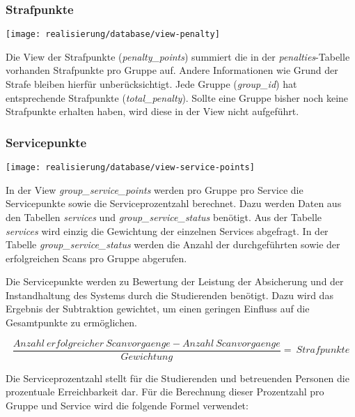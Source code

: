 \subsubsection{Strafpunkte}
\begin{center}
	\texttt{[image: realisierung/database/view-penalty]}
	\label{fig:realisierung-view-penalty}
\end{center}

Die View der Strafpunkte (\textit{penalty\_points}) summiert die in der \textit{penalties}-Tabelle vorhanden Strafpunkte pro Gruppe auf. Andere Informationen wie Grund der Strafe bleiben hierfür unberücksichtigt. Jede Gruppe (\textit{group\_id}) hat entsprechende Strafpunkte (\textit{total\_penalty}). Sollte eine Gruppe bisher noch keine Strafpunkte erhalten haben, wird diese in der View nicht aufgeführt.

\subsubsection{Servicepunkte}
\begin{center}
	\texttt{[image: realisierung/database/view-service-points]}
	\label{fig:realisierung-view-service-points}
\end{center}

In der View \textit{group\_service\_points} werden pro Gruppe pro Service die Servicepunkte sowie die Serviceprozentzahl  berechnet. Dazu werden Daten aus den Tabellen \textit{services} und \textit{group\_service\_status} benötigt. Aus der Tabelle \textit{services} wird einzig die Gewichtung der einzelnen Services abgefragt. In der Tabelle \textit{group\_service\_status} werden die Anzahl der durchgeführten sowie der erfolgreichen Scans pro Gruppe abgerufen.

Die Servicepunkte werden zu Bewertung der Leistung der Absicherung und der Instandhaltung des Systems durch die Studierenden benötigt. Dazu wird das Ergebnis der Subtraktion gewichtet, um einen geringen Einfluss auf die Gesamtpunkte zu ermöglichen.

\begin{equation*}
	\frac{Anzahl~erfolgreicher~Scanvorgaenge - Anzahl~Scanvorgaenge}{Gewichtung}=~Strafpunkte
\end{equation*}


Die Serviceprozentzahl stellt für die Studierenden und betreuenden Personen die prozentuale Erreichbarkeit dar. Für die Berechnung dieser Prozentzahl pro Gruppe und Service wird die folgende Formel verwendet: 

